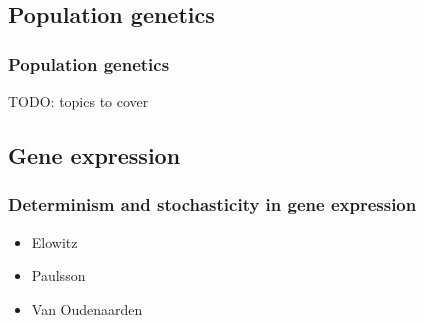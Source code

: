\subsection{Population genetics}
\begin{frame}
\frametitle{Population genetics}
TODO: topics to cover
\end{frame}

\subsection{Gene expression}
\begin{frame}
\frametitle{Determinism and stochasticity in gene expression}
\begin{itemize}
\item Elowitz \cite{Swain2002}
\item Paulsson \cite{Paulsson2004, Hilfinger2011, Lestas2010}
\item Van Oudenaarden \cite{Thattai2004, Munsky2012}
\end{itemize}
\end{frame}